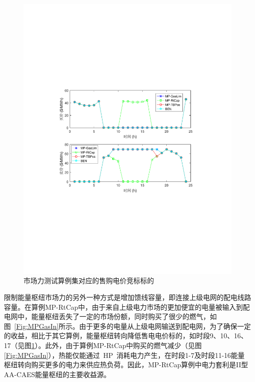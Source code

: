 \begin{figure}[!htp]
\centering
\includegraphics[scale=0.71]{figures/Chap4-16-MPCompElPrice.pdf}
\caption{市场力测试算例集对应的售购电价竞标标的}
\label{Fig:MPPriceE}
\end{figure}
限制能量枢纽市场力的另外一种方式是增加馈线容量，即连接上级电网的配电线路容量。在算例{MP-RtCap}中，由于来自上级电力市场的更加便宜的电量被输入到配电网中，能量枢纽丢失了一定的市场份额，同时购买了很少的燃气，如图~\ref{Fig:MPGasIn}所示。由于更多的电量从上级电网输送到配电网，为了确保一定的收益，相比于其它算例，能量枢纽转向降低售电电价标的，如时段9、10、16、17（见图\ref{Fig:MPPriceE}）。此外，由于算例{MP-RtCap}中购买的燃气减少（见图\ref{Fig:MPGasIn}），热能仅能通过~HP~消耗电力产生，在时段1-7及时段11-16能量枢纽转向购买更多的电力来供应热负荷。因此，{MP-RtCap}算例中电力套利是II型AA-CAES能量枢纽的主要收益源。


